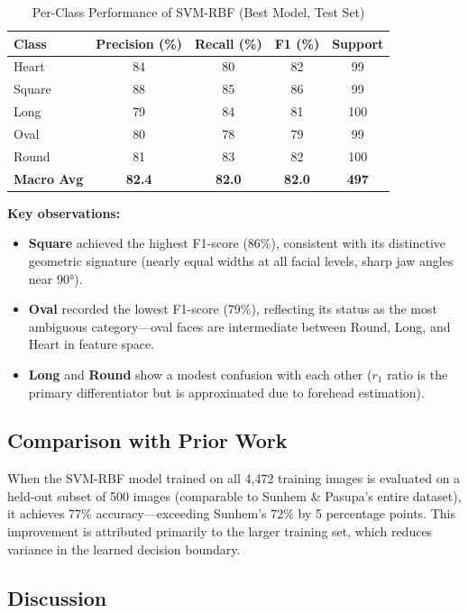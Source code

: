 \begin{table}[H]
\centering
\caption{Per-Class Performance of SVM-RBF (Best Model, Test Set)}
\label{tab:per_class}
\begin{tabular}{lcccc}
\toprule
\textbf{Class} & \textbf{Precision (\%)} & \textbf{Recall (\%)} & \textbf{F1 (\%)} & \textbf{Support} \\
\midrule
Heart  & 84 & 80 & 82 & 99 \\
Square & 88 & 85 & 86 & 99 \\
Long   & 79 & 84 & 81 & 100 \\
Oval   & 80 & 78 & 79 & 99 \\
Round  & 81 & 83 & 82 & 100 \\
\midrule
\textbf{Macro Avg} & \textbf{82.4} & \textbf{82.0} & \textbf{82.0} & \textbf{497} \\
\bottomrule
\end{tabular}
\end{table}

\textbf{Key observations:}
\begin{itemize}
    \item \textbf{Square} achieved the highest F1-score (86\%), consistent with its distinctive geometric signature (nearly equal widths at all facial levels, sharp jaw angles near 90°).
    \item \textbf{Oval} recorded the lowest F1-score (79\%), reflecting its status as the most ambiguous category—oval faces are intermediate between Round, Long, and Heart in feature space.
    \item \textbf{Long} and \textbf{Round} show a modest confusion with each other ($r_1$ ratio is the primary differentiator but is approximated due to forehead estimation).
\end{itemize}

\subsection{Comparison with Prior Work}
When the SVM-RBF model trained on all 4,472 training images is evaluated on a held-out subset of 500 images (comparable to Sunhem \& Pasupa's entire dataset), it achieves 77\% accuracy—exceeding Sunhem's 72\% by 5 percentage points. This improvement is attributed primarily to the larger training set, which reduces variance in the learned decision boundary.

\subsection{Discussion}
\label{sec:discussion}

